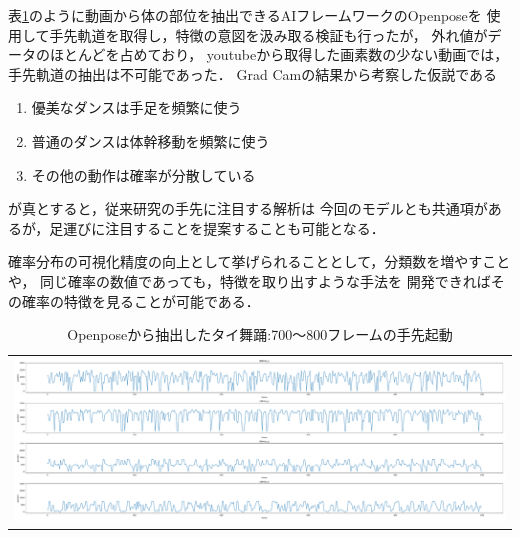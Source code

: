 表\ref{json}のように動画から体の部位を抽出できるAIフレームワークのOpenpose\cite{openpose}を
使用して手先軌道を取得し，特徴の意図を汲み取る検証も行ったが，
外れ値がデータのほとんどを占めており，
youtubeから取得した画素数の少ない動画では，手先軌道の抽出は不可能であった．
Grad Camの結果から考察した仮説である
\begin{enumerate}
  \item 優美なダンスは手足を頻繁に使う
  \item 普通のダンスは体幹移動を頻繁に使う
  \item その他の動作は確率が分散している
\end{enumerate}
が真とすると，従来研究の手先に注目する解析は
今回のモデルとも共通項があるが，足運びに注目することを提案することも可能となる．

確率分布の可視化精度の向上として挙げられることとして，分類数を増やすことや，
同じ確率の数値であっても，特徴を取り出すような手法を
開発できればその確率の特徴を見ることが可能である．

\begin{table}[b]
  \begin{center}
    \begin{tabular}{c}
      \includegraphics[width=130mm]{images/dist/thai_elegant_json.pdf} \\
    \end{tabular}
  \end{center}
  \caption{Openposeから抽出したタイ舞踊:700〜800フレームの手先起動}
  \label{json}
\end{table}
\clearpage